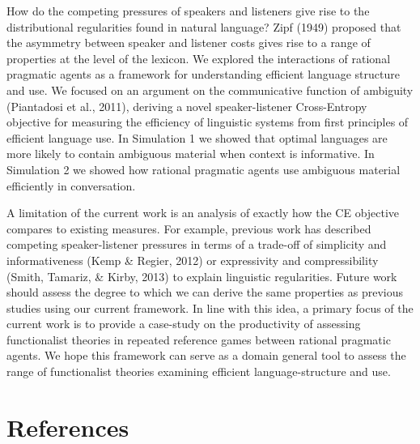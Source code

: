 \documentclass[10pt, letterpaper]{article}
\begin{document}
How do the competing pressures of speakers and listeners give rise to
the distributional regularities found in natural language? Zipf (1949)
proposed that the asymmetry between speaker and listener costs gives
rise to a range of properties at the level of the lexicon. We explored
the interactions of rational pragmatic agents as a framework for
understanding efficient language structure and use. We focused on an
argument on the communicative function of ambiguity (Piantadosi et al.,
2011), deriving a novel speaker-listener Cross-Entropy objective for
measuring the efficiency of linguistic systems from first principles of
efficient language use. In Simulation 1 we showed that optimal languages
are more likely to contain ambiguous material when context is
informative. In Simulation 2 we showed how rational pragmatic agents use
ambiguous material efficiently in conversation.\par

A limitation of the current work is an analysis of exactly how the CE
objective compares to existing measures. For example, previous work has
described competing speaker-listener pressures in terms of a trade-off
of simplicity and informativeness (Kemp \& Regier, 2012) or expressivity
and compressibility (Smith, Tamariz, \& Kirby, 2013) to explain
linguistic regularities. Future work should assess the degree to which
we can derive the same properties as previous studies using our current
framework. In line with this idea, a primary focus of the current work
is to provide a case-study on the productivity of assessing
functionalist theories in repeated reference games between rational
pragmatic agents. We hope this framework can serve as a domain general
tool to assess the range of functionalist theories examining efficient
language-structure and use.\par

\vspace{1em}

\vspace{1em} \noindent

\section{References}\label{references}

\setlength{\parindent}{-0.1in} \setlength{\leftskip}{0.125in} \noindent
\end{document}

